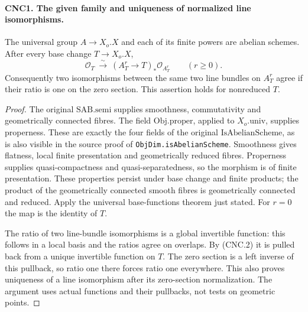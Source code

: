 \paragraph{CNC1. The given family and uniqueness of normalized line isomorphisms.}
\label{claim:CNC1}
The universal group \(A\to X_o.X\) and each of its finite powers are
abelian schemes.  After every base change \(T\to X_o.X\),
\[
 \mathcal O_T\ \xrightarrow{\ \sim\ }\ (A_T^r\to T)_*
                       \mathcal O_{A_T^r}\qquad(r\geq0).       \tag{CNC.2}
\]
Consequently two isomorphisms between the same two line bundles on
\(A_T^r\) agree if their ratio is one on the zero section.  This assertion
holds for nonreduced \(T\).
\begin{proof}
The original \(\mathrm{SAB}.\mathrm{semi}\) supplies smoothness,
commutativity and geometrically connected fibres.  The field
\(\mathrm{Obj}.\mathrm{proper}\), applied to \(X_o.\mathrm{univ}\),
supplies properness.  These are exactly the four fields of the original
\(\mathrm{IsAbelianScheme}\), as is also visible in the source proof of
\texttt{ObjDim.isAbelianScheme}.  Smoothness gives flatness, local finite
presentation and geometrically reduced fibres.  Properness supplies
quasi-compactness and quasi-separatedness, so the morphism is of finite
presentation.  These properties persist under base change and finite
products; the product of the geometrically connected smooth fibres is
geometrically connected and reduced.  Apply the universal base-functions
theorem just stated.  For \(r=0\) the map is the identity of \(T\).

The ratio of two line-bundle isomorphisms is a global invertible
function: this follows in a local basis and the ratios agree on overlaps.
By (CNC.2) it is pulled back from a unique invertible function on \(T\).
The zero section is a left inverse of this pullback, so ratio one there
forces ratio one everywhere.  This also proves uniqueness of a line
isomorphism after its zero-section normalization.  The argument uses
actual functions and their pullbacks, not tests on geometric points.
\end{proof}

